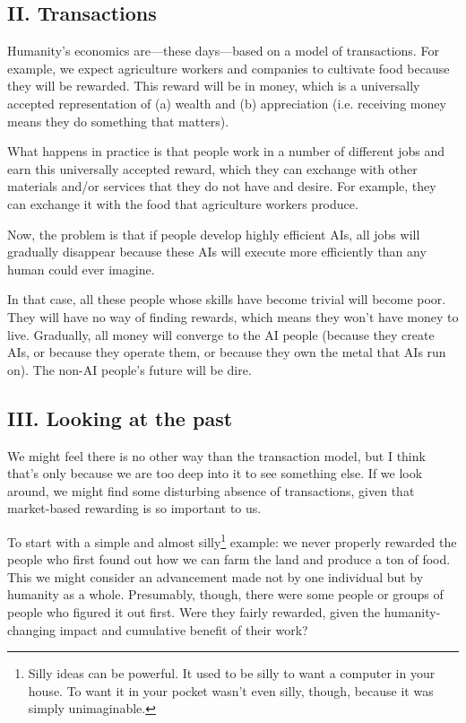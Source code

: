 \subsection{II. Transactions}

Humanity’s economics are—these days—based on a model of transactions. For example, we expect agriculture workers and companies to cultivate food because they will be rewarded. This reward will be in money, which is a universally accepted representation of (a) wealth and (b) appreciation (i.e. receiving money means they do something that matters).

What happens in practice is that people work in a number of different jobs and earn this universally accepted reward, which they can exchange with other materials and/or services that they do not have and desire. For example, they can exchange it with the food that agriculture workers produce.

Now, the problem is that if people develop highly efficient AIs, all jobs will gradually disappear because these AIs will execute more efficiently than any human could ever imagine.

In that case, all these people whose skills have become trivial will become poor. They will have no way of finding rewards, which means they won’t have money to live. Gradually, all money will converge to the AI people (because they create AIs, or because they operate them, or because they own the metal that AIs run on). The non-AI people’s future will be dire.

\subsection{III. Looking at the past}

We might feel there is no other way than the transaction model, but I think that’s only because we are too deep into it to see something else. If we look around, we might find some disturbing absence of transactions, given that market-based rewarding is so important to us.

To start with a simple and almost silly\footnote{Silly ideas can be powerful. It used to be silly to want a computer in your house. To want it in your pocket wasn’t even silly, though, because it was simply unimaginable.} example: we never properly rewarded the people who first found out how we can farm the land and produce a ton of food. This we might consider an advancement made not by one individual but by humanity as a whole. Presumably, though, there were some people or groups of people who figured it out first. Were they fairly rewarded, given the humanity-changing impact and cumulative benefit of their work?

